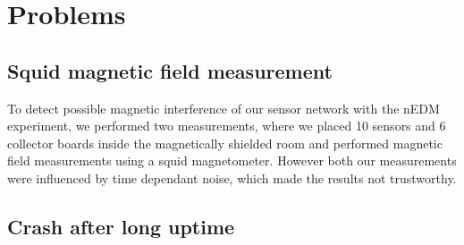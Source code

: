 \documentclass[a4paper]{scrreprt}
\begin{document}
\section{Problems}
\subsection{Squid magnetic field measurement}
To detect possible magnetic interference of our sensor network with the nEDM experiment,
we performed two measurements, where
we placed 10 sensors and 6 collector boards inside the magnetically shielded room and performed
magnetic field measurements using a squid magnetometer. However both our measurements were
influenced by time dependant noise, which made the results not trustworthy.
\subsection{Crash after long uptime}
\end{document}
